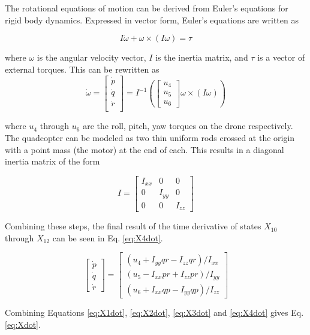 \documentclass[letterpaper, paper,11pt]{AAS}	%
\begin{document}
The rotational equations of motion can be derived from Euler’s equations for rigid body dynamics. Expressed in vector form, Euler’s equations are written as

\[
I\dot{\omega}+\omega\times(I\omega)=\tau
\]

where $\omega$ is the angular velocity vector, $I$ is the inertia matrix, and $\tau$ is a vector of external torques. This can be rewritten as
\[
\dot{\omega}=\begin{bmatrix}
\dot{p}\\
\dot{q}\\
\dot{r}\\
\end{bmatrix}=
I^{-1}(\begin{bmatrix}
u_4\\u_5\\u_6
\end{bmatrix}\omega\times	(I\omega))
\]

where $u_4$ through $u_6$ are the roll, pitch, yaw torques on the drone respectively. The quadcopter can be modeled as two thin uniform rods crossed at the origin with a point mass (the motor) at the end of each. This results in a diagonal inertia matrix of the form

\[
I = \begin{bmatrix}
I_{xx}&0&0\\
0&I_{yy}&0\\
0&0&I_{zz}
\end{bmatrix}
\]

Combining these steps, the final result of the time derivative of states $X_{10}$ through $X_{12}$ can be seen in Eq. \eqref{eq:X4dot}\cite{X4dot}.

\begin{equation}
\label{eq:X4dot}
\begin{bmatrix}
\dot{p}\\
\dot{q}\\
\dot{r}
\end{bmatrix}=
\begin{bmatrix}
(u_4 + I_{yy}qr - I_{zz}qr)/I_{xx}\\
(u_5 - I_{xx}pr + I_{zz}pr)/I_{yy}\\
(u_6 + I_{xx}qp - I_{yy}qp)/I_{zz}
\end{bmatrix}
\end{equation}

Combining Equations \ref{eq:X1dot}, \ref{eq:X2dot}, \ref{eq:X3dot} and \ref{eq:X4dot} gives Eq. \eqref{eq:Xdot}.
\end{document}

